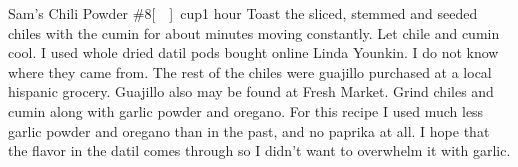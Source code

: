 \begin{recipe}{Sam's Chili Powder \#8}{\unit[]{cup}}{1 hour}
Toast the sliced, stemmed and seeded chiles with the cumin for about \unit[3--4]{minutes} moving constantly.  Let chile and cumin cool.
\freeform I used whole dried datil pods bought online Linda Younkin.  I do not know where they came from.  The rest of the chiles were guajillo purchased at a local hispanic grocery.  Guajillo also may be found at Fresh Market.
Grind chiles and cumin along with garlic powder and oregano.
\freeform For this recipe I used much less garlic powder and oregano than in the past, and no paprika at all.  I hope that the flavor in the datil comes through so I didn't want to overwhelm it with garlic.
\end{recipe}
